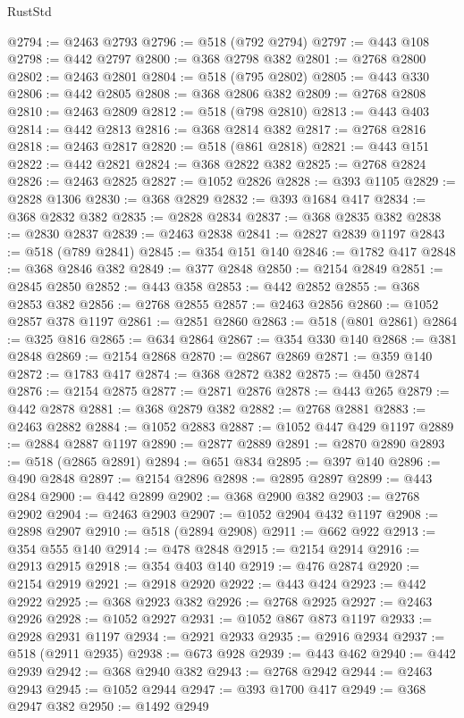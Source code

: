 \begin{lexlean}{RustStd}
\begin{coremodule}
@2794 := @2463 @2793
@2796 := @518 (@792 @2794)
@2797 := @443 @108
@2798 := @442 @2797
@2800 := @368 @2798 @382
@2801 := @2768 @2800
@2802 := @2463 @2801
@2804 := @518 (@795 @2802)
@2805 := @443 @330
@2806 := @442 @2805
@2808 := @368 @2806 @382
@2809 := @2768 @2808
@2810 := @2463 @2809
@2812 := @518 (@798 @2810)
@2813 := @443 @403
@2814 := @442 @2813
@2816 := @368 @2814 @382
@2817 := @2768 @2816
@2818 := @2463 @2817
@2820 := @518 (@861 @2818)
@2821 := @443 @151
@2822 := @442 @2821
@2824 := @368 @2822 @382
@2825 := @2768 @2824
@2826 := @2463 @2825
@2827 := @1052 @2826
@2828 := @393 @1105
@2829 := @2828 @1306
@2830 := @368 @2829
@2832 := @393 @1684 @417
@2834 := @368 @2832 @382
@2835 := @2828 @2834
@2837 := @368 @2835 @382
@2838 := @2830 @2837
@2839 := @2463 @2838
@2841 := @2827 @2839 @1197
@2843 := @518 (@789 @2841)
@2845 := @354 @151 @140
@2846 := @1782 @417
@2848 := @368 @2846 @382
@2849 := @377 @2848
@2850 := @2154 @2849
@2851 := @2845 @2850
@2852 := @443 @358
@2853 := @442 @2852
@2855 := @368 @2853 @382
@2856 := @2768 @2855
@2857 := @2463 @2856
@2860 := @1052 @2857 @378 @1197
@2861 := @2851 @2860
@2863 := @518 (@801 @2861)
@2864 := @325 @816
@2865 := @634 @2864
@2867 := @354 @330 @140
@2868 := @381 @2848
@2869 := @2154 @2868
@2870 := @2867 @2869
@2871 := @359 @140
@2872 := @1783 @417
@2874 := @368 @2872 @382
@2875 := @450 @2874
@2876 := @2154 @2875
@2877 := @2871 @2876
@2878 := @443 @265
@2879 := @442 @2878
@2881 := @368 @2879 @382
@2882 := @2768 @2881
@2883 := @2463 @2882
@2884 := @1052 @2883
@2887 := @1052 @447 @429 @1197
@2889 := @2884 @2887 @1197
@2890 := @2877 @2889
@2891 := @2870 @2890
@2893 := @518 (@2865 @2891)
@2894 := @651 @834
@2895 := @397 @140
@2896 := @490 @2848
@2897 := @2154 @2896
@2898 := @2895 @2897
@2899 := @443 @284
@2900 := @442 @2899
@2902 := @368 @2900 @382
@2903 := @2768 @2902
@2904 := @2463 @2903
@2907 := @1052 @2904 @432 @1197
@2908 := @2898 @2907
@2910 := @518 (@2894 @2908)
@2911 := @662 @922
@2913 := @354 @555 @140
@2914 := @478 @2848
@2915 := @2154 @2914
@2916 := @2913 @2915
@2918 := @354 @403 @140
@2919 := @476 @2874
@2920 := @2154 @2919
@2921 := @2918 @2920
@2922 := @443 @424
@2923 := @442 @2922
@2925 := @368 @2923 @382
@2926 := @2768 @2925
@2927 := @2463 @2926
@2928 := @1052 @2927
@2931 := @1052 @867 @873 @1197
@2933 := @2928 @2931 @1197
@2934 := @2921 @2933
@2935 := @2916 @2934
@2937 := @518 (@2911 @2935)
@2938 := @673 @928
@2939 := @443 @462
@2940 := @442 @2939
@2942 := @368 @2940 @382
@2943 := @2768 @2942
@2944 := @2463 @2943
@2945 := @1052 @2944
@2947 := @393 @1700 @417
@2949 := @368 @2947 @382
@2950 := @1492 @2949

\end{coremodule}
\end{lexlean}
